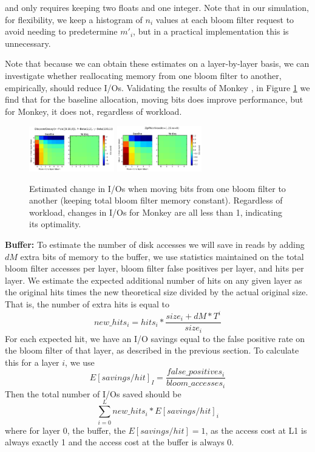 \documentclass{sig-alternate-05-2015}
\begin{document}
and only requires keeping two floats and one integer. Note that in our simulation, for flexibility, we keep a histogram of $n_i$ values at each bloom filter request to avoid needing to predetermine $m'_i$, but in a practical implementation this is unnecessary.

Note that because we can obtain these estimates on a layer-by-layer basis, we can investigate whether reallocating memory from one bloom filter to another, empirically, should reduce I/Os. Validating the results of Monkey \cite{monkey}, in Figure \ref{fig:bloom-realloc} we find that for the baseline allocation, moving bits does improve performance, but for Monkey, it does not, regardless of workload.

\begin{figure}[!htb]
\begin{center}
\includegraphics[width=0.33\textwidth]{bloom-moves-disc.png}
\includegraphics[width=0.33\textwidth]{bloom-moves-zipf.png}
\end{center}
\caption{Estimated change in I/Os when moving bits from one bloom filter to another (keeping total bloom filter memory constant). Regardless of workload, changes in I/Os for Monkey are all less than 1, indicating its optimality.}
\label{fig:bloom-realloc}
\end{figure}

\textbf{Buffer:} To estimate the number of disk accesses we will save in reads by adding $dM$ extra bits of memory to the buffer, we use statistics maintained on the total bloom filter accesses per layer, bloom filter false positives per layer, and hits per layer. We estimate the expected
additional number of hits on any given layer as the original hits times the new theoretical size divided by the actual original size.
That is, the number of extra hits is equal to $$new\_hits_{i} = hits_{i} * \frac{size_{i} + dM*T^{i} }{ size_{i}}$$
For each expected hit, we have an I/O savings equal to the false positive rate on the bloom filter of that layer, as described in the previous section. To calculate this for a layer $i$, we use 
$$E[savings/hit]_{I} = \frac{false\_positives_{i}}{bloom\_accesses_{i}}$$
Then the total number of I/Os saved should be 
$$
\sum_{i=0}^L new\_hits_{i} * E[savings/hit]_{i} 
$$
where for layer 0, the buffer, the $E[savings/hit] = 1$, as the access cost at L1 is always exactly 1 and the access cost at 
the buffer is always 0.
\end{document}
